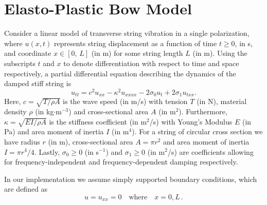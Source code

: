 \documentclass[twoside,a4paper,dvipsnames]{article}
\def\SWcomment[#1]{\textcolor{Green}{#1}}
\begin{document}
\section{Elasto-Plastic Bow Model}\label{sec:elasto}

Consider a linear model of transverse string vibration in a single polarization, where $u(x,t)$ represents string displacement as a function of time $t\geq 0$, in s, and coordinate $x\in[0,\,L]$ (in m) for some string length $L$ (in m). Using the subscripts $t$ and $x$ to denote differentiation with respect to time and space respectively, a partial differential equation describing the dynamics of the damped stiff string is \cite{Bilbao2009}
\begin{equation}\label{eq:PDE}
    u_{tt} = c^2u_{xx}-\kappa^2u_{xxxx}-2\sigma_0u_t+2\sigma_1u_{txx}.
\end{equation}
Here, $c = \sqrt{T/\rho A}$ is the wave speed (in m/s) with tension $T$ (in N), material density $\rho$ (in kg$\cdot$m$^{-3}$) and cross-sectional area $A$ (in m$^2$). Furthermore, $\kappa = \sqrt{EI/\rho A}$ is the stiffness coefficient (in m$^2$/s) with Young's Modulus $E$ (in Pa) and area moment of inertia $I$ (in m$^4$). For a string of circular cross section we have radius $r$ (in m), cross-sectional area $A=\pi r^2$ and area moment of inertia $I=\pi r^4 /4$.  Lastly, $\sigma_0 \geq 0$ (in s$^{-1}$) and $\sigma_1 \geq 0$ (in m$^2$/s) 
are coefficients allowing for frequency-independent and frequency-dependent damping respectively. 

In our implementation we assume simply supported boundary conditions, which are defined as
\begin{equation}
    u = u_{xx} = 0 \quad \text{where} \quad x = 0, L\, .
\end{equation}
\end{document}
